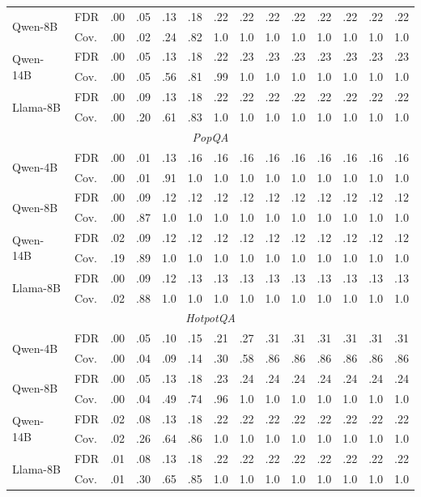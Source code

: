 \begin{table}[h]
{\begin{tabular}{ll|cccccccccccc}
\multirow{2}{*}{Qwen-8B}
 & FDR & .00 & .05 & .13 & .18 & .22 & .22 & .22 & .22 & .22 & .22 & .22 & .22 \\
 & Cov. & .00 & .02 & .24 & .82 & 1.0 & 1.0 & 1.0 & 1.0 & 1.0 & 1.0 & 1.0 & 1.0 \\
\multirow{2}{*}{Qwen-14B}
 & FDR & .00 & .05 & .13 & .18 & .22 & .23 & .23 & .23 & .23 & .23 & .23 & .23 \\
 & Cov. & .00 & .05 & .56 & .81 & .99 & 1.0 & 1.0 & 1.0 & 1.0 & 1.0 & 1.0 & 1.0 \\
\multirow{2}{*}{Llama-8B}
 & FDR & .00 & .09 & .13 & .18 & .22 & .22 & .22 & .22 & .22 & .22 & .22 & .22 \\
 & Cov. & .00 & .20 & .61 & .83 & 1.0 & 1.0 & 1.0 & 1.0 & 1.0 & 1.0 & 1.0 & 1.0 \\
\midrule
\multicolumn{14}{c}{\textit{PopQA}} \\
\midrule
\multirow{2}{*}{Qwen-4B}
 & FDR & .00 & .01 & .13 & .16 & .16 & .16 & .16 & .16 & .16 & .16 & .16 & .16 \\
 & Cov. & .00 & .01 & .91 & 1.0 & 1.0 & 1.0 & 1.0 & 1.0 & 1.0 & 1.0 & 1.0 & 1.0 \\
\multirow{2}{*}{Qwen-8B}
 & FDR & .00 & .09 & .12 & .12 & .12 & .12 & .12 & .12 & .12 & .12 & .12 & .12 \\
 & Cov. & .00 & .87 & 1.0 & 1.0 & 1.0 & 1.0 & 1.0 & 1.0 & 1.0 & 1.0 & 1.0 & 1.0 \\
\multirow{2}{*}{Qwen-14B}
 & FDR & .02 & .09 & .12 & .12 & .12 & .12 & .12 & .12 & .12 & .12 & .12 & .12 \\
 & Cov. & .19 & .89 & 1.0 & 1.0 & 1.0 & 1.0 & 1.0 & 1.0 & 1.0 & 1.0 & 1.0 & 1.0 \\
\multirow{2}{*}{Llama-8B}
 & FDR & .00 & .09 & .12 & .13 & .13 & .13 & .13 & .13 & .13 & .13 & .13 & .13 \\
 & Cov. & .02 & .88 & 1.0 & 1.0 & 1.0 & 1.0 & 1.0 & 1.0 & 1.0 & 1.0 & 1.0 & 1.0 \\
\midrule
\multicolumn{14}{c}{\textit{HotpotQA}} \\
\midrule
\multirow{2}{*}{Qwen-4B}
 & FDR & .00 & .05 & .10 & .15 & .21 & .27 & .31 & .31 & .31 & .31 & .31 & .31 \\
 & Cov. & .00 & .04 & .09 & .14 & .30 & .58 & .86 & .86 & .86 & .86 & .86 & .86 \\
\multirow{2}{*}{Qwen-8B}
 & FDR & .00 & .05 & .13 & .18 & .23 & .24 & .24 & .24 & .24 & .24 & .24 & .24 \\
 & Cov. & .00 & .04 & .49 & .74 & .96 & 1.0 & 1.0 & 1.0 & 1.0 & 1.0 & 1.0 & 1.0 \\
\multirow{2}{*}{Qwen-14B}
 & FDR & .02 & .08 & .13 & .18 & .22 & .22 & .22 & .22 & .22 & .22 & .22 & .22 \\
 & Cov. & .02 & .26 & .64 & .86 & 1.0 & 1.0 & 1.0 & 1.0 & 1.0 & 1.0 & 1.0 & 1.0 \\
\multirow{2}{*}{Llama-8B}
 & FDR & .01 & .08 & .13 & .18 & .22 & .22 & .22 & .22 & .22 & .22 & .22 & .22 \\
 & Cov. & .01 & .30 & .65 & .85 & 1.0 & 1.0 & 1.0 & 1.0 & 1.0 & 1.0 & 1.0 & 1.0 \\
\bottomrule
\end{tabular}%
}
\end{table}

